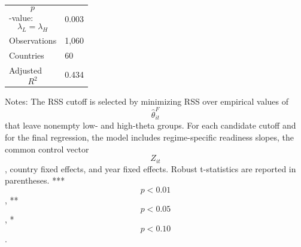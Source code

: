 \begin{table}[H]
\begin{threeparttable}
\begin{tabularx}{\textwidth}{lY}
$$p$$-value: $$\lambda_L=\lambda_H$$ & 0.003 \\
Observations & 1,060 \\
Countries & 60 \\
Adjusted $$R^2$$ & 0.434 \\
\bottomrule
\end{tabularx}
\begin{tablenotes}[flushleft]\footnotesize
\item Notes: The RSS cutoff is selected by minimizing RSS over empirical values of $$\widehat{\theta}^{F}_{it}$$ that leave nonempty low- and high-theta groups. For each candidate cutoff and for the final regression, the model includes regime-specific readiness slopes, the common control vector $$Z_{it}$$, country fixed effects, and year fixed effects. Robust t-statistics are reported in parentheses. *** $$p<0.01$$, ** $$p<0.05$$, * $$p<0.10$$.
\end{tablenotes}
\end{threeparttable}
\end{table}
